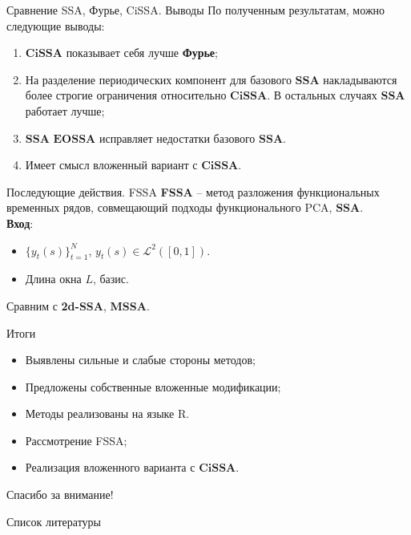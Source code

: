 \documentclass[notheorems, handout]{beamer}
\newcommand{\SSA}{\textbf{SSA}}
\newcommand{\EOSSA}{\textbf{EOSSA}}
\newcommand{\CISSA}{\textbf{CiSSA}}
\begin{document}
\begin{frame}{Сравнение SSA, Фурье, CiSSA. Выводы}
	По полученным результатам, можно следующие выводы:
	\begin{enumerate}
		\item $\CISSA$ показывает себя лучше \textbf{Фурье};
		\item На разделение периодических компонент для базового $\SSA$ накладываются более строгие ограничения относительно $\CISSA$. В остальных случаях $\SSA$ работает лучше;
		\item $\SSA$ $\EOSSA$ исправляет недостатки базового $\SSA$.
		\item Имеет смысл вложенный вариант с $\CISSA$.
	\end{enumerate}


\end{frame}


\begin{frame}{Последующие действия. FSSA}
	\textbf{FSSA} -- метод разложения функциональных временных рядов, совмещающий подходы функционального PCA, $\SSA$. \\
	\vspace{0.2cm}
	\textbf{Вход}: \\
	\begin{itemize}
		\item \( \{y_t(s)\}_{t=1}^N \), \( y_t(s) \in \mathcal{L}^2([0,1]) \).
		\item Длина окна \( L \), базис.
	\end{itemize}
	\vspace{0.2cm}

	Сравним с \textbf{2d-SSA}, \textbf{MSSA}.

\end{frame}


\begin{frame}{Итоги}
	\textbf{}
	\begin{itemize}
		\item Выявлены сильные и слабые стороны методов;
		\item Предложены собственные вложенные модификации;
		\item Методы реализованы на языке R.
	\end{itemize}

	\textbf{}
	\begin{itemize}
		\item Рассмотрение FSSA;
		\item Реализация вложенного варианта с $\CISSA$.
	\end{itemize}
\end{frame}

\begin{frame}
	\begin{center}
		\Huge
		Спасибо за внимание!
	\end{center}

\end{frame}

\begin{frame}[allowframebreaks]{Список литературы}
	\printbibliography
\end{frame}
\end{document}
